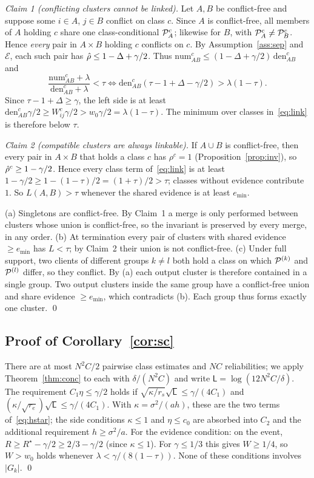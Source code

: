 \emph{Claim 1 (conflicting clusters cannot be linked).} Let $A,B$ be conflict-free and suppose some $i\in A$, $j\in B$ conflict on class $c$. Since $A$ is conflict-free, all members of $A$ holding $c$ share one class-conditional $\mathcal{P}_A^c$; likewise for $B$, with $\mathcal{P}_A^c\neq\mathcal{P}_B^c$. Hence \emph{every} pair in $A\times B$ holding $c$ conflicts on $c$. By Assumption~\ref{ass:sep} and $\mathcal E$, each such pair has $\hat\rho\le1-\Delta+\gamma/2$. Thus $\mathrm{num}^c_{AB}\le(1-\Delta+\gamma/2)\,\mathrm{den}^c_{AB}$ and
\[\frac{\mathrm{num}^c_{AB}+\lambda}{\mathrm{den}^c_{AB}+\lambda}<\tau\iff \mathrm{den}^c_{AB}(\tau-1+\Delta-\gamma/2)>\lambda(1-\tau).\]
Since $\tau-1+\Delta\ge\gamma$, the left side is at least $\mathrm{den}^c_{AB}\gamma/2\ge W_{ij}^c\gamma/2>w_0\gamma/2=\lambda(1-\tau)$. The minimum over classes in~\eqref{eq:link} is therefore below $\tau$.

\emph{Claim 2 (compatible clusters are always linkable).} If $A\cup B$ is conflict-free, then every pair in $A\times B$ that holds a class $c$ has $\rho^c=1$ (Proposition~\ref{prop:inv}), so $\hat\rho^c\ge1-\gamma/2$. Hence every class term of~\eqref{eq:link} is at least $1-\gamma/2\ge1-(1-\tau)/2=(1+\tau)/2>\tau$; classes without evidence contribute $1$. So $L(A,B)>\tau$ whenever the shared evidence is at least $e_{\min}$.

(a) Singletons are conflict-free. By Claim~1 a merge is only performed between clusters whose union is conflict-free, so the invariant is preserved by every merge, in any order. (b) At termination every pair of clusters with shared evidence $\ge e_{\min}$ has $L<\tau$; by Claim~2 their union is not conflict-free. (c) Under full support, two clients of different groups $k\ne l$ both hold a class on which $\mathcal{P}^{(k)}$ and $\mathcal{P}^{(l)}$ differ, so they conflict. By (a) each output cluster is therefore contained in a single group. Two output clusters inside the same group have a conflict-free union and share evidence $\ge e_{\min}$, which contradicts (b). Each group thus forms exactly one cluster. \qed

\subsection{Proof of Corollary~\ref{cor:sc}}
There are at most $N^2C/2$ pairwise class estimates and $NC$ reliabilities; we apply Theorem~\ref{thm:conc} to each with $\delta/(N^2C)$ and write $\mathsf L=\log(12N^2C/\delta)$. The requirement $C_1\eta\le\gamma/2$ holds if $\sqrt{\kappa/r_s}\sqrt{\mathsf L}\le\gamma/(4C_1)$ and $(\kappa/\sqrt{r_e})\sqrt{\mathsf L}\le\gamma/(4C_1)$. With $\kappa=\sigma^2/(ah)$, these are the two terms of~\eqref{eq:hstar}; the side conditions $\kappa\le1$ and $\eta\le c_0$ are absorbed into $C_2$ and the additional requirement $h\ge\sigma^2/a$. For the evidence condition: on the event, $R\ge R^\star-\gamma/2\ge2/3-\gamma/2$ (since $\kappa\le1$). For $\gamma\le1/3$ this gives $W\ge1/4$, so $W>w_0$ holds whenever $\lambda<\gamma/(8(1-\tau))$. None of these conditions involves $|G_k|$. \qed


